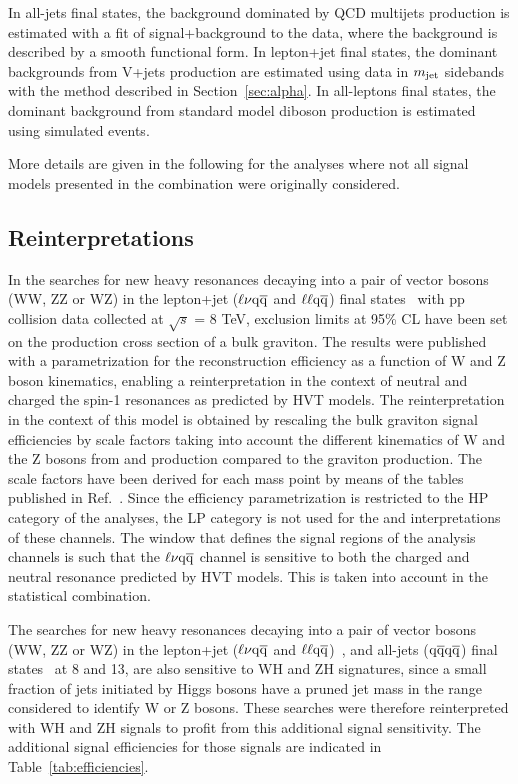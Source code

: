 In all-jets final states, the background dominated by QCD multijets production is estimated with a fit of signal+background to the data, where the background is described by a smooth functional form.
In lepton+jet final states, the dominant backgrounds from V+jets production are estimated using data in $m_{\text{jet}}$ sidebands with the method described in Section~\ref{sec:alpha}.
In all-leptons final states, the dominant background from standard model diboson production is estimated using simulated events.

More details are given in the following for the analyses where not all signal models presented in the combination were originally considered.

\subsection{Reinterpretations}

In the searches for new heavy resonances decaying into a pair of vector bosons (WW, ZZ or WZ) in the lepton+jet ($\ell \nu \mathrm{q}\overline{\mathrm{q}}$ and $\ell\ell \mathrm{q}\overline{\mathrm{q}}$) final states~\cite{Khachatryan:2014gha} with pp collision data collected at $\sqrt{s}$ = 8 TeV, exclusion limits at 95\% CL have been set on the production cross section of a bulk graviton.
The results were published with a parametrization for the reconstruction efficiency as a function of W and Z boson kinematics, enabling a reinterpretation in the context of neutral and charged the spin-1 resonances as predicted by HVT models.
The reinterpretation in the context of this model is obtained by rescaling the bulk graviton signal efficiencies by scale factors taking into account the different kinematics of W and the Z bosons from \PWpr{} and \cPZpr{} production compared to the graviton production.
The scale factors have been derived for each mass point by means of the tables published in Ref.~\cite{Khachatryan:2014gha}.
Since the efficiency parametrization is restricted to the HP category of the analyses, the LP category is not used for the \PWpr{} and \cPZpr{} interpretations of these channels.
The \mJ window that defines the signal regions of the analysis channels is such that the $\ell \nu \mathrm{q}\overline{\mathrm{q}}$ channel is sensitive to both the charged and neutral resonance predicted by HVT models. This is taken into account in the statistical combination.

The searches for new heavy resonances decaying into a pair of vector bosons (WW, ZZ or WZ) in the lepton+jet ($\ell \nu \mathrm{q}\overline{\mathrm{q}}$ and $\ell\ell \mathrm{q}\overline{\mathrm{q}}$)~\cite{Khachatryan:2014gha,Khachatryan:2014gha,CMS-PAS-EXO-15-002}, and all-jets ($\mathrm{q}\overline{\mathrm{q}} \mathrm{q}\overline{\mathrm{q}}$) final states~\cite{Khachatryan:2014hpa,CMS-PAS-EXO-15-002} at 8 and 13\TeV, are also sensitive to WH and ZH signatures, since a small fraction of jets initiated by Higgs bosons have a pruned jet mass in the range considered to identify W or Z bosons.
These searches were therefore reinterpreted with WH and ZH signals to profit from this additional signal sensitivity.
The additional signal efficiencies for those signals are indicated in Table~\ref{tab:efficiencies}.

